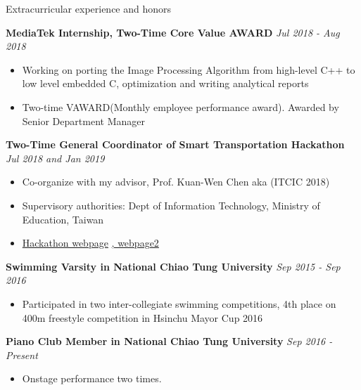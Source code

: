 \documentclass{resume} %
\begin{document}
\begin{rSection}{Extracurricular experience and honors}

{\bf MediaTek Internship, Two-Time Core Value AWARD} \hfill {\em Jul 2018 - Aug 2018}
\begin{itemize}
    \item Working on porting the Image Processing Algorithm from high-level C++ to low level embedded C, optimization and writing analytical reports
    \item Two-time VAWARD(Monthly employee performance award). Awarded by Senior Department Manager
\end{itemize}

{\bf Two-Time General Coordinator of Smart Transportation Hackathon } \hfill {\em Jul 2018 and Jan 2019}
\begin{itemize}
    \item Co-organize with my advisor, Prof. Kuan-Wen Chen aka (ITCIC 2018)
    \item Supervisory authorities: Dept of Information Technology, Ministry of Education, Taiwan
    \item \href{http://covis.cs.nctu.edu.tw/ITCIC2018/}{Hackathon webpage} \href{http://covis.cs.nctu.edu.tw/ITCIC2018/}{, webpage2}
\end{itemize}

{\bf Swimming Varsity in National Chiao Tung University} \hfill {\em Sep 2015 - Sep 2016}
\begin{itemize}
    \item Participated in two inter-collegiate swimming competitions, 4th place on 400m freestyle competition in Hsinchu Mayor Cup 2016
\end{itemize}

{\bf Piano Club Member in National Chiao Tung University} \hfill {\em Sep 2016 - Present}
\begin{itemize}
    \item Onstage performance two times.
\end{itemize}

\end{rSection}
\end{document}
